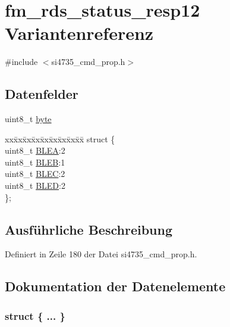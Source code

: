 \hypertarget{unionfm__rds__status__resp12}{}\section{fm\+\_\+rds\+\_\+status\+\_\+resp12 Variantenreferenz}
\label{unionfm__rds__status__resp12}


{\ttfamily \#include $<$si4735\+\_\+cmd\+\_\+prop.\+h$>$}

\subsection*{Datenfelder}
\begin{DoxyCompactItemize}
\item 
uint8\+\_\+t \hyperlink{unionfm__rds__status__resp12_a96f44d20f1dbf1c8785a7bc99a46164c}{byte}
\item 
\begin{tabbing}
xx\=xx\=xx\=xx\=xx\=xx\=xx\=xx\=xx\=\kill
struct \{\\
\>uint8\_t \hyperlink{unionfm__rds__status__resp12_a22256b3ddf2070027c87504d1de20c2f}{BLEA}:2\\
\>uint8\_t \hyperlink{unionfm__rds__status__resp12_aadd978be8508790bbf25c9a488ea553c}{BLEB}:1\\
\>uint8\_t \hyperlink{unionfm__rds__status__resp12_a279b7213c9f5034e0fa7aa8d9c2bc9a2}{BLEC}:2\\
\>uint8\_t \hyperlink{unionfm__rds__status__resp12_a3498d51c8fc84119a00242f7bb9b6719}{BLED}:2\\
\}; \\

\end{tabbing}\end{DoxyCompactItemize}


\subsection{Ausführliche Beschreibung}


Definiert in Zeile 180 der Datei si4735\+\_\+cmd\+\_\+prop.\+h.



\subsection{Dokumentation der Datenelemente}
\hypertarget{unionfm__rds__status__resp12_af90e7e6552a2167deee58ceee56f279d}{}\subsubsection[{"@27}]{\setlength{\rightskip}{0pt plus 5cm}struct \{ ... \} }\label{unionfm__rds__status__resp12_af90e7e6552a2167deee58ceee56f279d}
\hypertarget{unionfm__rds__status__resp12_a22256b3ddf2070027c87504d1de20c2f}{}
